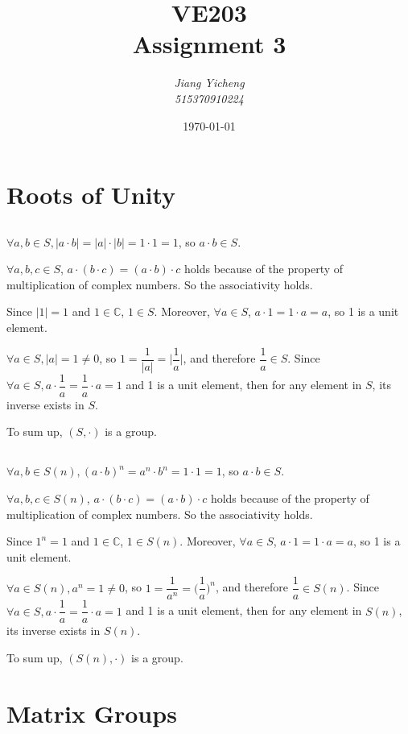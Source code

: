 \documentclass[a4paper,12pt,titlepage]{article}
\author{\textit{Jiang Yicheng}\\\textit{515370910224}}
\title{\textbf{VE203\\
		Assignment 3}}
\date{\today}
\begin{document}
\maketitle

\section{Roots of Unity}
\subsection{}$\forall a,b\in S,|a\cdot b|=|a|\cdot|b|=1\cdot1=1$, so $a\cdot b\in S$.

$\forall a,b,c\in S$, $a\cdot(b\cdot c)=(a\cdot b)\cdot c$ holds because of the property of multiplication of complex numbers. So the associativity holds.

Since $|1|=1$ and $1\in\mathbb{C}$, $1\in S$. Moreover, $\forall a\in S$, $a\cdot 1=1\cdot a=a$, so 1 is a unit element.

$\forall a\in S, |a|=1\neq0$, so $1=\dfrac{1}{|a|}=\Big|\dfrac{1}{a}\Big|$, and therefore $\dfrac{1}{a}\in S$. Since $\forall a\in S,a\cdot \dfrac{1}{a}=\dfrac{1}{a}\cdot a=1$ and 1 is a unit element, then for any element in $S$, its inverse exists in $S$.

To sum up, $(S,\cdot)$ is a group.   

\subsection{}
$\forall a,b\in S(n),(a\cdot b)^n=a^n\cdot b^n =1\cdot1=1$, so $a\cdot b\in S$.

$\forall a,b,c\in S(n)$, $a\cdot(b\cdot c)=(a\cdot b)\cdot c$ holds because of the property of multiplication of complex numbers. So the associativity holds.

Since $1^n=1$ and $1\in\mathbb{C}$, $1\in S(n)$. Moreover, $\forall a\in S$, $a\cdot 1=1\cdot a=a$, so 1 is a unit element.

$\forall a\in S(n), a^n=1\neq0$, so $1=\dfrac{1}{a^n}=\Big(\dfrac{1}{a}\Big)^n$, and therefore $\dfrac{1}{a}\in S(n)$. Since $\forall a\in S,a\cdot \dfrac{1}{a}=\dfrac{1}{a}\cdot a=1$ and 1 is a unit element, then for any element in $S(n)$, its inverse exists in $S(n)$.

To sum up, $(S(n),\cdot)$ is a group.   

\section{Matrix Groups}
\end{document}

